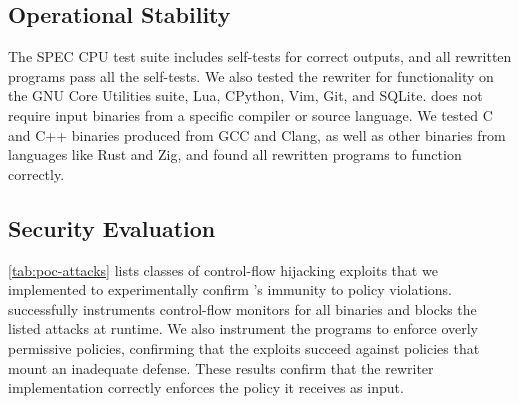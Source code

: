 

\subsection{Operational Stability}\label{sec:functionality_evaluation}
The SPEC CPU test suite includes self-tests for correct outputs,
and all rewritten programs pass all the self-tests.
We also tested the rewriter for functionality on the GNU Core Utilities suite, Lua, CPython, Vim, Git, and SQLite.
\pname does not require input binaries from a specific compiler or source language.
We tested C and C++ binaries produced from GCC and Clang,
as well as other binaries from languages like Rust and Zig,
and found all rewritten programs to function correctly.

\subsection{Security Evaluation}



\autoref{tab:poc-attacks} lists classes of control-flow hijacking exploits that we implemented to experimentally confirm \pname's immunity to policy violations.
\pname successfully instruments control-flow monitors for all binaries and blocks
the listed attacks at runtime.
We also instrument the programs to enforce overly permissive policies, confirming that the exploits succeed against policies that mount an inadequate defense.
These results confirm that the rewriter implementation correctly enforces the policy it receives as input.



